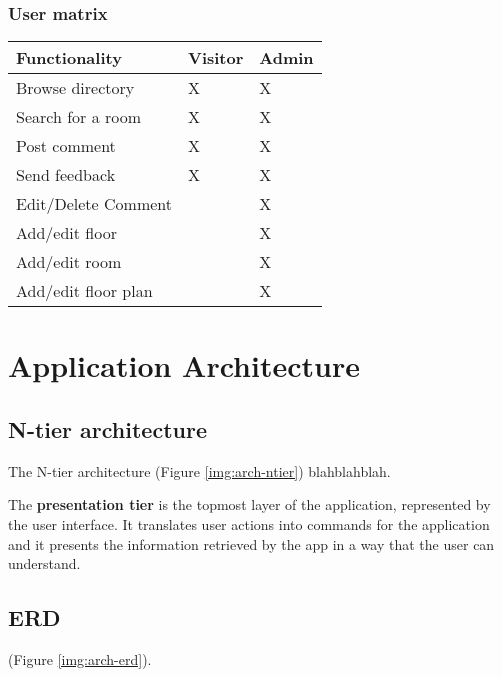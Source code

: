 \documentclass{sig-alt-release2}
\begin{document}
\subsubsection*{User matrix}
\begin{tabular}{| p{4cm} | p{1cm} | p{1cm}|} \hline
\textbf{Functionality} & \textbf{Visitor} & \textbf{Admin} \\ \hline
Browse directory & X & X \\ \hline
Search for a room & X & X \\ \hline
Post comment & X & X \\ \hline
Send feedback & X & X \\ \hline
Edit/Delete Comment & & X \\ \hline
Add/edit floor &  & X \\ \hline
Add/edit room & & X \\ \hline
Add/edit floor plan & & X \\ \hline

\end{tabular}	


\section{Application Architecture}

\subsection*{N-tier architecture}
The N-tier architecture (Figure \ref{img:arch-ntier}) blahblahblah.

The \textbf{presentation tier} is the topmost layer of the application,
represented by the user interface. It translates user actions into commands
for the application and it presents the information retrieved by the app in a
way that the user can understand.



\subsection*{ERD}

 (Figure \ref{img:arch-erd}).

\end{document}
